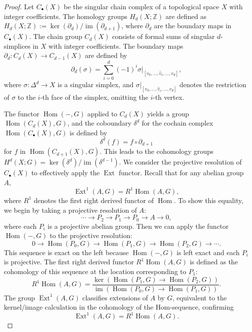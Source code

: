 \begin{proof}
	Let $C_{\bullet}(X)$ be the singular chain complex of a topological space $X$ with
	integer coefficients. The homology groups $H_{d}(X; \mathbb{Z})$ are defined
	as
	$H_{d}(X; \mathbb{Z}) := \ker(\partial_{d}) / \operatorname{im}(\partial_{d+1})$,
	where $\partial_{d}$ are the boundary maps in $C_{\bullet}(X)$. The chain
	group $C_{d}(X)$ consists of formal sums of singular $d$-simplices in $X$ with
	integer coefficients. The boundary maps $\partial_{d}: C_{d}(X) \rightarrow C_{d-1}
	(X)$ are defined by
	\[
		\partial_{d}(\sigma) = \sum_{i=0}^{d}(-1)^{i} \sigma|_{[v_0, \ldots, \hat{v}_i,
		\ldots, v_d]},
	\]
	where $\sigma: \Delta^{d} \rightarrow X$ is a singular simplex, and
	$\sigma|_{[v_0, \ldots, \hat{v}_i, \ldots, v_d]}$ denotes the restriction of
	$\sigma$ to the $i$-th face of the simplex, omitting the $i$-th vertex.

	The functor $\operatorname{Hom}(-, G)$ applied to $C_{d}(X)$ yields a group $\operatorname{Hom}
	(C_{d}(X), G)$, and the coboundary $\delta^{d}$ for the cochain complex
	$\operatorname{Hom}(C_{\bullet}(X), G)$ is defined by
	\[
		\delta^{d}(f) = f \circ \partial_{d+1}
	\]
	for $f$ in $\operatorname{Hom}(C_{d+1}(X), G)$. This leads to the cohomology groups
	$H^{d}(X; G) = \ker(\delta^{d}) / \operatorname{im}(\delta^{d-1})$. We
	consider the projective resolution of $C_{\bullet}(X)$ to effectively apply
	the $\operatorname{Ext}$ functor. Recall that for any abelian group $A$,
	\[
		\operatorname{Ext}^{1}(A, G) = R^{1} \operatorname{Hom}(A, G),
	\]
	where $R^{1}$ denotes the first right derived functor of $\operatorname{Hom}$.
	To show this equality, we begin by taking a projective resolution of $A$:
	\[
		\cdots \to P_{2} \to P_{1} \to P_{0} \to A \to 0,
	\]
	where each $P_{i}$ is a projective abelian group. Then we can apply the
	functor $\operatorname{Hom}(-, G)$ to the projective resolution:
	\[
		0 \to \operatorname{Hom}(P_{0}, G) \to \operatorname{Hom}(P_{1}, G) \to \operatorname{Hom}
		(P_{2}, G) \to \cdots.
	\]
	This sequence is exact on the left because $\operatorname{Hom}(-, G)$ is left exact
	and each $P_{i}$ is projective. The first right derived functor
	$R^{1}\operatorname{Hom}(A, G)$ is defined as the cohomology of this sequence
	at the location corresponding to $P_{1}$:
	\[
		R^{1} \operatorname{Hom}(A, G) = \frac{\ker(\operatorname{Hom}(P_{1}, G) \to
		\operatorname{Hom}(P_{2}, G))}{\operatorname{im}(\operatorname{Hom}(P_{0}, G)
		\to \operatorname{Hom}(P_{1}, G))}.
	\]
	The group $\operatorname{Ext}^{1}(A, G)$ classifies extensions of $A$ by $G$,
	equivalent to the kernel/image calculation in the cohomology of the
	$\text{Hom}$-sequence, confirming
	\[
		\operatorname{Ext}^{1}(A, G) = R^{1} \operatorname{Hom}(A, G).
	\]


\end{proof}
